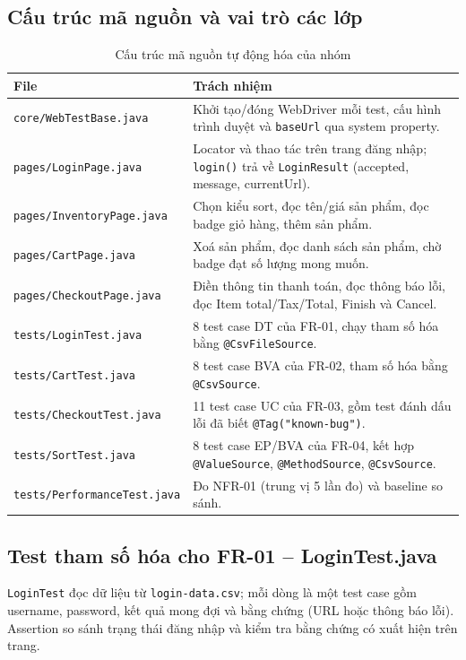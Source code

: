 \documentclass[12pt,a4paper]{article}
\newcommand{\tablestyle}{\small\renewcommand{\arraystretch}{1.25}}
\newcommand{\hrow}{\rowcolor{tablehead}}
\begin{document}
\subsection{Cấu trúc mã nguồn và vai trò các lớp}
\begin{table}[H]
\centering
\tablestyle
\caption{Cấu trúc mã nguồn tự động hóa của nhóm}
\label{tab:structure}
\begin{tabularx}{\textwidth}{L{5.8cm}Y}
\toprule
\hrow \textbf{File} & \textbf{Trách nhiệm} \\
\midrule
\texttt{core/WebTestBase.java} & Khởi tạo/đóng WebDriver mỗi test, cấu hình trình duyệt và \texttt{baseUrl} qua system property. \\
\texttt{pages/LoginPage.java} & Locator và thao tác trên trang đăng nhập; \texttt{login()} trả về \texttt{LoginResult} (accepted, message, currentUrl). \\
\texttt{pages/InventoryPage.java} & Chọn kiểu sort, đọc tên/giá sản phẩm, đọc badge giỏ hàng, thêm sản phẩm. \\
\texttt{pages/CartPage.java} & Xoá sản phẩm, đọc danh sách sản phẩm, chờ badge đạt số lượng mong muốn. \\
\texttt{pages/CheckoutPage.java} & Điền thông tin thanh toán, đọc thông báo lỗi, đọc Item total/Tax/Total, Finish và Cancel. \\
\texttt{tests/LoginTest.java} & 8 test case DT của FR-01, chạy tham số hóa bằng \texttt{@CsvFileSource}. \\
\texttt{tests/CartTest.java} & 8 test case BVA của FR-02, tham số hóa bằng \texttt{@CsvSource}. \\
\texttt{tests/CheckoutTest.java} & 11 test case UC của FR-03, gồm test đánh dấu lỗi đã biết \texttt{@Tag("known-bug")}. \\
\texttt{tests/SortTest.java} & 8 test case EP/BVA của FR-04, kết hợp \texttt{@ValueSource}, \texttt{@MethodSource}, \texttt{@CsvSource}. \\
\texttt{tests/PerformanceTest.java} & Đo NFR-01 (trung vị 5 lần đo) và baseline so sánh. \\
\bottomrule
\end{tabularx}
\end{table}

\subsection{Test tham số hóa cho FR-01 -- LoginTest.java}
\texttt{LoginTest} đọc dữ liệu từ \texttt{login-data.csv}; mỗi dòng là một test case gồm
username, password, kết quả mong đợi và bằng chứng (URL hoặc thông báo lỗi). Assertion so
sánh trạng thái đăng nhập và kiểm tra bằng chứng có xuất hiện trên trang.
\end{document}
